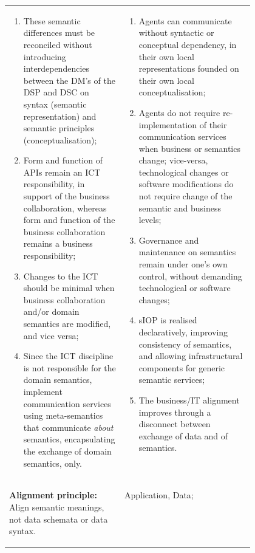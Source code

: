 \begin{xltabular}[l]{\linewidth}{@{} >{\small\raggedright\arraybackslash}p{0.47\linewidth} >{\small\raggedright\arraybackslash}X @{}}
\begin{enumerate}[left=6pt, nosep]
  \item These semantic differences must be reconciled without introducing interdependencies between the DM's of the DSP and DSC on syntax (semantic representation) and semantic principles (conceptualisation);
  \item Form and function of APIs remain an ICT responsibility, in support of the business collaboration, whereas form and function of the business collaboration remains a business responsibility;
  \item Changes to the ICT should be minimal when business collaboration and/or domain semantics are modified, and vice versa;
  \item Since the ICT discipline is not responsible for the domain semantics, implement communication services using meta-semantics that communicate \emph{about} semantics, encapsulating the exchange of domain semantics, only.
\end{enumerate}
&
\begin{enumerate}[left=10pt, nosep]
  \item Agents can communicate without syntactic or conceptual dependency, in their own local representations founded on their own local conceptualisation;
  \item Agents do not require re-implementation of their communication services when business or semantics change; vice-versa, technological changes or software modifications do not require change of the semantic and business levels;
  \item Governance and maintenance on semantics remain under one's own control, without demanding technological or software changes;
  \item sIOP is realised declaratively, improving consistency of semantics, and allowing infrastructural components for generic semantic services;
  \item The business/IT alignment improves through a disconnect between exchange of data and of semantics.
\end{enumerate} \\
%
%
%
\begin{mmdp}\label{dp:ap}{\bfseries Alignment principle:}
\quad Align semantic meanings, not data schemata or data syntax.  \end{mmdp}
&
\begin{description}[labelwidth=3.7cm,leftmargin=3.7cm+1ex,nosep,topsep=2ex,labelsep=1ex,font=\bfseries]
  \item[Type of information:] Application, Data;

\end{description}
\end{xltabular}
